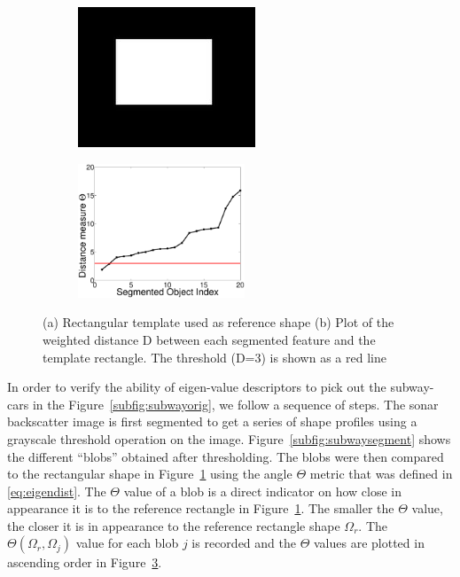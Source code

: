 \documentclass {udthesis}
\begin{document}
\begin{figure}
\centering
  \begin{subfigure}[]{0.3\textwidth}
      \includegraphics[width=\textwidth]{eigenrect}
      \caption{}
      \label{subfig:subwayrect}
  \end{subfigure}
  \begin{subfigure}[]{0.4\textwidth}
      \includegraphics[width=\textwidth,height=4cm]{subway_dot_prod}
      \caption{}
      \label{subfig:eigendistances}
  \end{subfigure}
\caption[Plot of similarity measures of different underwater objects to the subway car reference profile]{(a) Rectangular template used as reference shape (b) Plot of the weighted distance D between each segmented feature and the template rectangle. The threshold (D=3) is shown as a red line}
\end{figure}


In order to verify the ability of eigen-value descriptors to pick out the subway-cars in the Figure~\ref{subfig:subwayorig}, we follow a sequence of steps. The sonar backscatter image is first segmented to get a series of shape profiles using a grayscale threshold operation on the image. Figure~\ref{subfig:subwaysegment} shows the different ``blobs'' obtained after thresholding. The blobs were then compared to the rectangular shape in Figure~\ref{subfig:subwayrect} using the angle $\Theta$ metric that was defined in \eqref{eq:eigendist}. The $\Theta$ value of a blob is a direct indicator on how close in appearance it is to the reference rectangle in Figure~\ref{subfig:subwayrect}. The smaller the $\Theta$ value, the closer it is in appearance to the reference rectangle shape $\Omega_r$. The $\Theta(\Omega_r,\Omega_j)$ value for each blob $j$ is recorded and the $\Theta$ values are plotted in ascending order in Figure~\ref{subfig:eigendistances}. 
\end{document}
